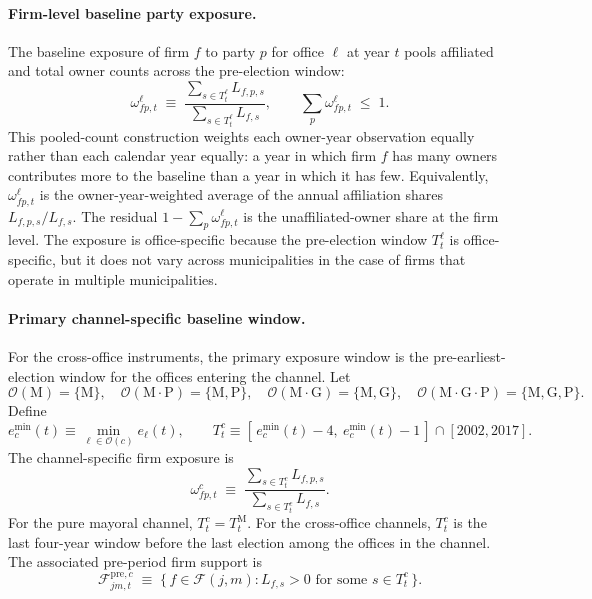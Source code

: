 \documentclass{article}
\newcommand{\cF}{\mathcal{F}}
\theoremstyle{plain}
\theoremstyle{definition}
\theoremstyle{remark}
\begin{document}
\paragraph{Firm-level baseline party exposure.}
The baseline exposure of firm $f$ to party $p$ for office $\ell$ at year
$t$ pools affiliated and total owner counts across the pre-election
window:
\begin{equation}\label{eq:omega-firm}
  \omega^{\ell}_{fp,t}
  \;\equiv\;
  \frac{\sum_{s\in T^{\ell}_{t}} L_{f,p,s}}
       {\sum_{s\in T^{\ell}_{t}} L_{f,s}},
  \qquad
  \sum_{p} \omega^{\ell}_{fp,t} \;\le\; 1.
\end{equation}
This pooled-count construction weights each owner-year observation
equally rather than each calendar year equally: a year in which firm
$f$ has many owners contributes more to the baseline than a year in
which it has few. Equivalently, $\omega^{\ell}_{fp,t}$ is the
owner-year-weighted average of the annual affiliation shares
$L_{f,p,s}/L_{f,s}$. The residual $1-\sum_{p}\omega^{\ell}_{fp,t}$ is
the unaffiliated-owner share at the firm level. The exposure is
office-specific because the pre-election window $T^{\ell}_{t}$ is
office-specific, but it does not vary across municipalities in the case
of firms that operate in multiple municipalities.

\paragraph{Primary channel-specific baseline window.}
For the cross-office instruments, the primary exposure window is the
pre-earliest-election window for the offices entering the channel. Let
\[
  \mathcal{O}(\mathrm{M})=\{\mathrm{M}\},\quad
  \mathcal{O}(\mathrm{M{\cdot}P})=\{\mathrm{M},\mathrm{P}\},\quad
  \mathcal{O}(\mathrm{M{\cdot}G})=\{\mathrm{M},\mathrm{G}\},\quad
  \mathcal{O}(\mathrm{M{\cdot}G{\cdot}P})=\{\mathrm{M},\mathrm{G},\mathrm{P}\}.
\]
Define
\begin{equation}\label{eq:channel-window}
  e_c^{\min}(t)\equiv\min_{\ell\in\mathcal{O}(c)} e_\ell(t),
  \qquad
  T^c_t\equiv [\,e_c^{\min}(t)-4,\ e_c^{\min}(t)-1\,]\cap[2002,2017].
\end{equation}
The channel-specific firm exposure is
\begin{equation}\label{eq:omega-channel}
  \omega^{c}_{fp,t}
  \;\equiv\;
  \frac{\sum_{s\in T^{c}_{t}} L_{f,p,s}}
       {\sum_{s\in T^{c}_{t}} L_{f,s}}.
\end{equation}
For the pure mayoral channel, $T^c_t=T^{\mathrm{M}}_t$. For the
cross-office channels, $T^c_t$ is the last four-year window before the last election among the offices in the channel. The associated pre-period firm support is
\[
  \cF^{\mathrm{pre},c}_{jm,t}
  \;\equiv\;
  \big\{\, f\in\cF(j,m) : L_{f,s}>0
       \text{ for some } s\in T^{c}_{t} \,\big\}.
\]
\end{document}
